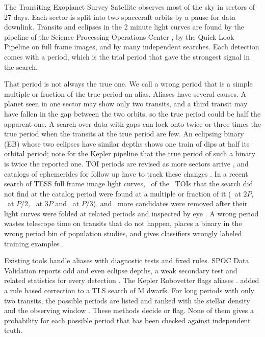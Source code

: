 \documentclass[twocolumn,linenumbers]{aastex701}
\begin{document}
The Transiting Exoplanet Survey Satellite \citep[TESS;][]{Ricker2015} observes most of the sky in sectors of 27 days. Each sector is split into two spacecraft orbits by a pause for data downlink. Transits and eclipses in the 2 minute light curves are found by the pipeline of the Science Processing Operations Center \citep[SPOC;][]{Jenkins2016}, by the Quick Look Pipeline \citep[QLP;][]{Huang2020a,Huang2020b} on full frame images, and by many independent searches. Each detection comes with a period, which is the trial period that gave the strongest signal in the search.

That period is not always the true one. We call a wrong period that is a simple multiple or fraction of the true period an alias. Aliases have several causes. A planet seen in one sector may show only two transits, and a third transit may have fallen in the gap between the two orbits, so the true period could be half the apparent one. A search over data with gaps can lock onto twice or three times the true period when the transits at the true period are few. An eclipsing binary (EB) whose two eclipses have similar depths shows one train of dips at half its orbital period; \citet{Twicken2018} note for the Kepler pipeline that the true period of such a binary is twice the reported one. TOI periods are revised as more sectors arrive \citep{Guerrero2021}, and catalogs of ephemerides for follow up have to track these changes \citep{Dragomir2020,Kostov2025}. In a recent search of TESS full frame image light curves, \litLafHarm\ of the \litLafMissed\ TOIs that the search did not find at the catalog period were found at a multiple or fraction of it (\litLafDouble\ at $2P$, \litLafHalf\ at $P/2$, \litLafTriple\ at $3P$ and \litLafThird\ at $P/3$), and \litLafRemoved\ more candidates were removed after their light curves were folded at related periods and inspected by eye \citep[][their Sections \litLafSecRec\ and \litLafSecVet]{Lafarga2026}. A wrong period wastes telescope time on transits that do not happen, places a binary in the wrong period bin of population studies, and gives classifiers wrongly labeled training examples \citep{Valizadegan2025}.

Existing tools handle aliases with diagnostic tests and fixed rules. SPOC Data Validation reports odd and even eclipse depths, a weak secondary test and related statistics for every detection \citep{Twicken2018,Li2019}. The Kepler Robovetter flags aliases \citep{Coughlin2016,Thompson2018}. \citet{Tschudi2026a} added a rule based correction to a TLS search of M dwarfs. For long periods with only two transits, the possible periods are listed and ranked with the stellar density and the observing window \citep{Cooke2021,Osborn2022,Hawthorn2024}. These methods decide or flag. None of them gives a probability for each possible period that has been checked against independent truth.
\end{document}
